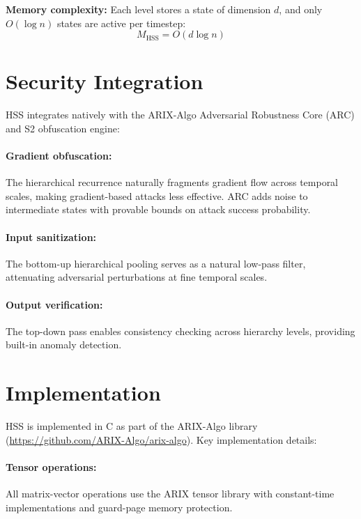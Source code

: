 \documentclass[10pt,twocolumn]{IEEEtran}
\begin{document}
\textbf{Memory complexity:} Each level stores a state of dimension
$d$, and only $O(\log n)$ states are active per timestep:
\begin{equation}
M_{\text{HSS}} = O(d \log n)
\end{equation}

\section{Security Integration}

HSS integrates natively with the ARIX-Algo Adversarial Robustness
Core (ARC) and S2 obfuscation engine:

\paragraph{Gradient obfuscation:} The hierarchical recurrence
naturally fragments gradient flow across temporal scales, making
gradient-based attacks less effective. ARC adds noise to intermediate
states with provable bounds on attack success probability.

\paragraph{Input sanitization:} The bottom-up hierarchical
pooling serves as a natural low-pass filter, attenuating
adversarial perturbations at fine temporal scales.

\paragraph{Output verification:} The top-down pass enables
consistency checking across hierarchy levels, providing
built-in anomaly detection.

\section{Implementation}

HSS is implemented in C as part of the ARIX-Algo library
(\url{https://github.com/ARIX-Algo/arix-algo}). Key implementation
details:

\paragraph{Tensor operations:} All matrix-vector operations use
the ARIX tensor library with constant-time implementations
and guard-page memory protection.
\end{document}
